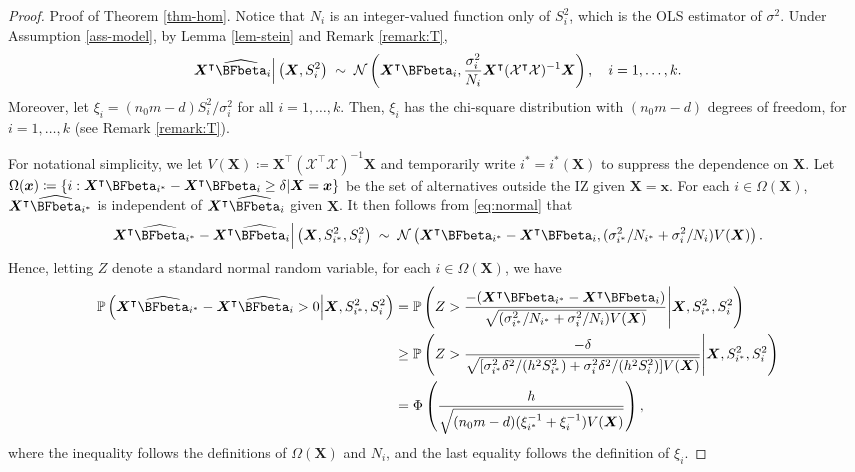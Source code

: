 \documentclass[ijoc,nonblindrev]{informs3}
\def\pr{\mathbb{P}}
\def\bx{{\bm x}}
\def\bX{{\bm X}}
\def\cN{{\mathcal N}}
\def\cX{{\mathcal X}}
\begin{document}
\begin{proof}{Proof of Theorem \ref{thm-hom}.}
Notice that $N_i$  is an integer-valued function only of $S_i^2$, which is the OLS estimator of $\sigma^2$.
Under Assumption \ref{ass-model}, by Lemma \ref{lem-stein} and Remark \ref{remark:T},
\begin{equation}\label{eq:normal}
\bX^\intercal \widehat{\BFbeta}_i \Big | \left(\bX, S_i^2\right) \; \sim \; \cN \left(\bX^\intercal \BFbeta_i,\frac{\sigma_i^2}{N_i}\bX^\intercal (\cX^\intercal \cX)^{-1} \bX \right ),\quad i=1,\ldots,k.
\end{equation}
Moreover, let $\xi_i = (n_0m-d)S_i^2/\sigma_i^2$ for all $i=1,\ldots,k$.
Then, $\xi_i$ has the chi-square distribution with $(n_0m-d)$ degrees of freedom, for $i=1,\ldots,k$ (see Remark \ref{remark:T}).

For notational simplicity, we let $V(\bX)\coloneqq \bX^\intercal (\cX^\intercal \cX)^{-1} \bX$ and temporarily write $i^*=i^*(\bX)$ to suppress the dependence on $\bX$.
Let $\Omega(\bx) \coloneqq \{i: \bX^\intercal \BFbeta_{i^*} - \bX^\intercal \BFbeta_i  \geq \delta | \bX=\bx\}$ be the set of alternatives outside the IZ given $\bX=\bx$.
For each $i \in \Omega(\bX)$, $\bX^\intercal \widehat{\BFbeta}_{i^*}$ is independent of $\bX^\intercal \widehat{\BFbeta}_i$ given $\bX$.
It then follows from \eqref{eq:normal} that
\begin{equation} \label{eq-normal}
\bX^\intercal \widehat{\BFbeta}_{i^*} - \bX^\intercal \widehat{\BFbeta}_i  \Big| \left(\bX, S_{i^*}^2, S_i^2\right)\; \sim\; \cN\left(\bX^\intercal \BFbeta_{i^*} - \bX^\intercal \BFbeta_i, ( \sigma_{i^*}^2 / N_{i^*}+\sigma_i^2/N_i) V(\bX) \right).
\end{equation}
Hence, letting  $Z$ denote a standard normal random variable, for each $i\in \Omega(\bX)$, we have
\begin{align}
 \pr \left(\bX^\intercal \widehat{\BFbeta}_{i^*} - \bX^\intercal \widehat{\BFbeta}_i  > 0 \Big| \bX,S_{i^*}^2,S_i^2 \right)
&= \pr \left(Z
>  \frac{ -(\bX^\intercal \BFbeta_{i^*} - \bX^\intercal \BFbeta_i )}{\sqrt{ (\sigma_{i^*}^2/N_{i^*}+\sigma_i^2/N_i) V(\bX)}} \Bigg| \bX,S_{i^*}^2,S_i^2 \right)\nonumber \\
&\geq \pr \left( Z
>  \frac{-\delta}{\sqrt{[\sigma_{i^*}^2  \delta^2 /(h^2 S_{i^*}^2) +\sigma_i^2  \delta^2 /(h^2 S_i^2)] V(\bX)}} \Bigg| \bX,S_{i^*}^2,S_i^2 \right)\nonumber \\
& =  \Phi\left( \frac{h}{\sqrt{(n_0m-d)(\xi_{i^*}^{-1} + \xi_i^{-1})V(\bX)}}  \right),  \label{eq-normalP}
\end{align}
where the inequality follows the definitions of $\Omega(\bX)$ and $N_i$, and the last equality follows the definition of $\xi_i$.



\end{proof}
\end{document}
